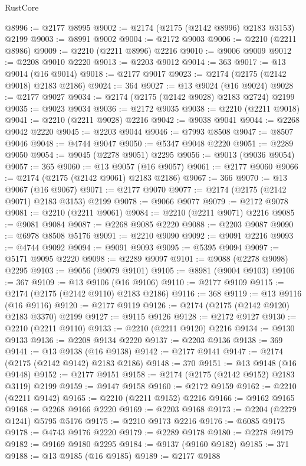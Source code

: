 \begin{lexlean}{RustCore}
\begin{coremodule}
@8996 := @2177 @8995
@9002 := @2174 (@2175 (@2142 @8996) @2183 @3153) @2199
@9003 := @8991 @9002
@9004 := @2172 @9003
@9006 := @2210 (@2211 @8986)
@9009 := @2210 (@2211 @8996) @2216
@9010 := @9006 @9009
@9012 := @2208 @9010 @2220
@9013 := @2203 @9012
@9014 := 363
@9017 := @13 @9014 (@16 @9014)
@9018 := @2177 @9017
@9023 := @2174 (@2175 (@2142 @9018) @2183 @2186)
@9024 := 364
@9027 := @13 @9024 (@16 @9024)
@9028 := @2177 @9027
@9034 := @2174 (@2175 (@2142 @9028) @2183 @2724) @2199
@9035 := @9023 @9034
@9036 := @2172 @9035
@9038 := @2210 (@2211 @9018)
@9041 := @2210 (@2211 @9028) @2216
@9042 := @9038 @9041
@9044 := @2268 @9042 @2220
@9045 := @2203 @9044
@9046 := @7993 @8508
@9047 := @8507 @9046
@9048 := @4744 @9047
@9050 := @5347 @9048 @2220
@9051 := @2289 @9050
@9054 := @9045 (@2278 @9051) @2295
@9056 := @9013 (@9036 @9054)
@9057 := 365
@9060 := @13 @9057 (@16 @9057)
@9061 := @2177 @9060
@9066 := @2174 (@2175 (@2142 @9061) @2183 @2186)
@9067 := 366
@9070 := @13 @9067 (@16 @9067)
@9071 := @2177 @9070
@9077 := @2174 (@2175 (@2142 @9071) @2183 @3153) @2199
@9078 := @9066 @9077
@9079 := @2172 @9078
@9081 := @2210 (@2211 @9061)
@9084 := @2210 (@2211 @9071) @2216
@9085 := @9081 @9084
@9087 := @2268 @9085 @2220
@9088 := @2203 @9087
@9090 := @6978 @8508 @5176
@9091 := @2210 @9090
@9092 := @9091 @2216
@9093 := @4744 @9092
@9094 := @9091 @9093
@9095 := @5395 @9094
@9097 := @5171 @9095 @2220
@9098 := @2289 @9097
@9101 := @9088 (@2278 @9098) @2295
@9103 := @9056 (@9079 @9101)
@9105 := @8981 (@9004 @9103)
@9106 := 367
@9109 := @13 @9106 (@16 @9106)
@9110 := @2177 @9109
@9115 := @2174 (@2175 (@2142 @9110) @2183 @2186)
@9116 := 368
@9119 := @13 @9116 (@16 @9116)
@9120 := @2177 @9119
@9126 := @2174 (@2175 (@2142 @9120) @2183 @3370) @2199
@9127 := @9115 @9126
@9128 := @2172 @9127
@9130 := @2210 (@2211 @9110)
@9133 := @2210 (@2211 @9120) @2216
@9134 := @9130 @9133
@9136 := @2208 @9134 @2220
@9137 := @2203 @9136
@9138 := 369
@9141 := @13 @9138 (@16 @9138)
@9142 := @2177 @9141
@9147 := @2174 (@2175 (@2142 @9142) @2183 @2186)
@9148 := 370
@9151 := @13 @9148 (@16 @9148)
@9152 := @2177 @9151
@9158 := @2174 (@2175 (@2142 @9152) @2183 @3119) @2199
@9159 := @9147 @9158
@9160 := @2172 @9159
@9162 := @2210 (@2211 @9142)
@9165 := @2210 (@2211 @9152) @2216
@9166 := @9162 @9165
@9168 := @2268 @9166 @2220
@9169 := @2203 @9168
@9173 := @2204 (@2279 @1241) @5795 @5176
@9175 := @2210 @9173 @2216
@9176 := @6085 @9175
@9178 := @4743 @9176 @2220
@9179 := @2289 @9178
@9180 := @2278 @9179
@9182 := @9169 @9180 @2295
@9184 := @9137 (@9160 @9182)
@9185 := 371
@9188 := @13 @9185 (@16 @9185)
@9189 := @2177 @9188

\end{coremodule}
\end{lexlean}
